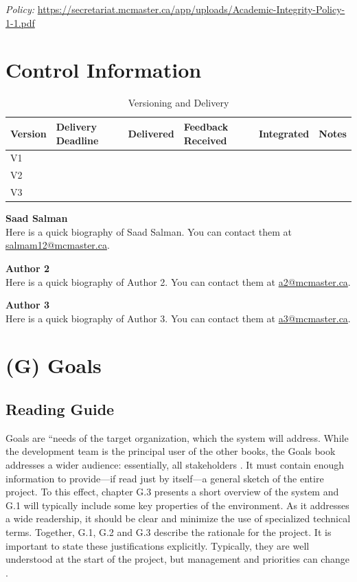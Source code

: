 \documentclass[12pt,letterpaper]{article}
\begin{document}
\medskip
\noindent\textit{Policy:} \url{https://secretariat.mcmaster.ca/app/uploads/Academic-Integrity-Policy-1-1.pdf}

\clearpage

\section{Control Information}
\begin{table}[h!]\centering
\caption*{Versioning and Delivery}
\renewcommand{\arraystretch}{1.2}
\begin{tabularx}{\textwidth}{@{}l l l l l l@{}}
\toprule
\textbf{Version} & \textbf{Delivery Deadline} & \textbf{Delivered} & \textbf{Feedback Received} & \textbf{Integrated} & \textbf{Notes} \\
\midrule
V1 & & & & & \\
V2 & & & & & \\
V3 & & & & & \\
\bottomrule
\end{tabularx}
\end{table}

\medskip
\noindent\textbf{Saad Salman} \\
Here is a quick biography of Saad Salman. You can contact them at \href{mailto:salmam12@mcmaster.ca}{salmam12@mcmaster.ca}.

\medskip
\noindent\textbf{Author 2} \\
Here is a quick biography of Author 2. You can contact them at \href{mailto:a2@mcmaster.ca}{a2@mcmaster.ca}.

\medskip
\noindent\textbf{Author 3} \\
Here is a quick biography of Author 3. You can contact them at \href{mailto:a3@mcmaster.ca}{a3@mcmaster.ca}.

\clearpage

\section{(G) Goals}
\subsection*{Reading Guide}
Goals are ``needs of the target organization, which the system will address. While the development team is the principal user of the other books, the Goals book addresses a wider audience: essentially, all stakeholders \cite{meyer2022}. It must contain enough information to provide---if read just by itself---a general sketch of the entire project. To this effect, chapter G.3 presents a short overview of the system and G.1 will typically include some key properties of the environment. As it addresses a wide readership, it should be clear and minimize the use of specialized technical terms. Together, G.1, G.2 and G.3 describe the rationale for the project. It is important to state these justifications explicitly. Typically, they are well understood at the start of the project, but management and priorities can change \cite{meyer2022}.
\end{document}
